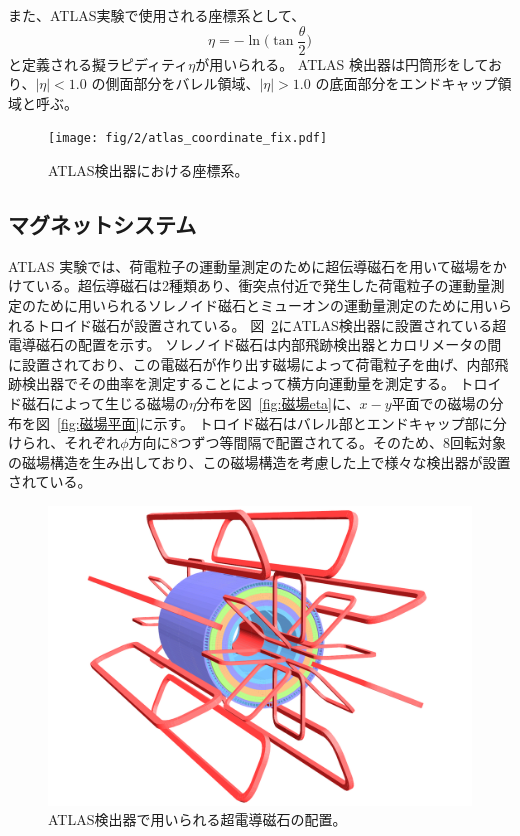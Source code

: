 また、ATLAS実験で使用される座標系として、
\begin{equation}
　\eta=-\ln\bigg(\tan\frac{\theta}{2}\bigg)
　\label{ラピディティ}
\end{equation}
と定義される擬ラピディティ$\eta$が用いられる。
ATLAS 検出器は円筒形をしており、$|\eta| < 1.0$ の側面部分をバレル領域、$|\eta| > 1.0$ の底面部分をエンドキャップ領域と呼ぶ。

\begin{figure}[tb]
  \centering
  \texttt{[image: fig/2/atlas\_coordinate\_fix.pdf]}
  \caption{ATLAS検出器における座標系。}
  \label{fig:a}
\end{figure}

\newpage
\subsection{マグネットシステム}\label{magnetic_filed}
ATLAS 実験では、荷電粒子の運動量測定のために超伝導磁石を用いて磁場をかけている。超伝導磁石は2種類あり、衝突点付近で発生した荷電粒子の運動量測定のために用いられるソレノイド磁石とミューオンの運動量測定のために用いられるトロイド磁石が設置されている。
図~\ref{fig:磁石}にATLAS検出器に設置されている超電導磁石の配置を示す。
ソレノイド磁石は内部飛跡検出器とカロリメータの間に設置されており、この電磁石が作り出す磁場によって荷電粒子を曲げ、内部飛跡検出器でその曲率を測定することによって横方向運動量を測定する。
トロイド磁石によって生じる磁場の$\eta$分布を図~\ref{fig:磁場eta}に、$x-y$平面での磁場の分布を図~\ref{fig:磁場平面}に示す。
トロイド磁石はバレル部とエンドキャップ部に分けられ、それぞれ$\phi$方向に8つずつ等間隔で配置されてる。そのため、8回転対象の磁場構造を生み出しており、この磁場構造を考慮した上で様々な検出器が設置されている。



\begin{figure}[tb]
  \centering
  \includegraphics[clip, width=14cm]{fig/2/ATLcoilGeom.pdf}
  \caption{ATLAS検出器で用いられる超電導磁石の配置\cite{Aad:1129811}。}
  \label{fig:磁石}
\end{figure}

